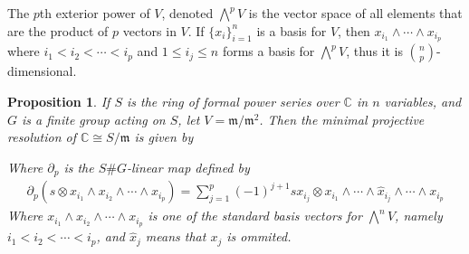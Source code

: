 \documentclass[11pt, a4paper, english]{article}
\newtheorem{prop}{Proposition}
\numberwithin{prop}{section}
\numberwithin{lemma}{section}
\numberwithin{theorem}{section}
\numberwithin{defin}{section}
\numberwithin{example}{section}
\newcommand{\C}{\mathbb{C}}
\begin{document}
The $p$th exterior power of $V$, denoted $\bigwedge\limits^p V$ is the vector space of all elements that are the product of $p$ vectors in $V$. If $\{ x_i \}_{i=1}^n$ is a basis for $V$, then $x_{i_1} \wedge \cdots \wedge x_{i_p}$ where $i_1 < i_2 < \cdots < i_p$ and $1 \leq i_j \leq n$ forms a basis for $\bigwedge\limits^p V$, thus it is ${n \choose p}$-dimensional.  

\begin{prop}
If $S$ is the ring of formal power series over $\C$ in $n$ variables, and $G$ is a finite group acting on $S$, let $V=\mathfrak{m}/\mathfrak{m}^2$. Then the minimal projective resolution of $\C \cong S/\mathfrak{m}$ is given by
\begin{center}
\end{center}
Where $\partial_p$ is the $S\#G$-linear map defined by
\begin{align*}
\partial_p(s \otimes x_{i_1} \wedge x_{i_2} \wedge \cdots \wedge x_{i_p}) = \sum_{j=1}^{p} (-1)^{j+1} sx_{i_j} \otimes x_{i_1} \wedge \cdots \wedge \hat{x}_{i_{j}} \wedge \cdots \wedge x_{i_{p}} 
\end{align*}
Where $x_{i_1} \wedge x_{i_2} \wedge \cdots \wedge x_{i_p}$ is one of the standard basis vectors for $\bigwedge\limits^n V$, namely $i_1 < i_2 < \cdots < i_p$, and  $\hat{x}_j$ means that $x_j$ is ommited.


\end{prop}
\end{document}
